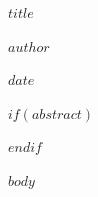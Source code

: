 \documentclass[12pt,twocolumn]{article}
\begin{document}
\begin{titlepage}
    \centering
    \vspace*{4cm}
    {\LARGE \bfseries $title$ \par}
    \vspace{2cm}
    {\large $author$ \par}
    \vspace{1cm}
    {\large $date$ \par}
    \vfill
\end{titlepage}

$if(abstract)$
\begin{abstract}
$abstract$
\end{abstract}
$endif$

$body$


\end{document}
